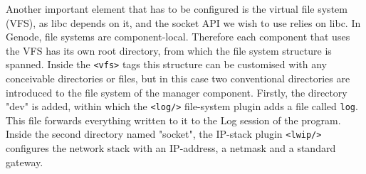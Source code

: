 Another important element that has to be configured is the virtual file system (VFS), as libc depends on it, and the socket API we wish to use relies on libc. In Genode, file systems are component-local. Therefore each component that uses the VFS has its own root directory, from which the file system structure is spanned. Inside the \verb|<vfs>| tags this structure can be customised with any conceivable directories or files, but in this case two conventional directories are introduced to the file system of the manager component. Firstly, the directory "dev" is added, within which the \verb|<log/>| file-system plugin adds a file called \verb|log|. This file forwards everything written to it to the Log session of the program.
Inside the second directory named "socket", the IP-stack plugin \verb|<lwip/>| configures the network stack with an IP-address, a netmask and a standard gateway.

